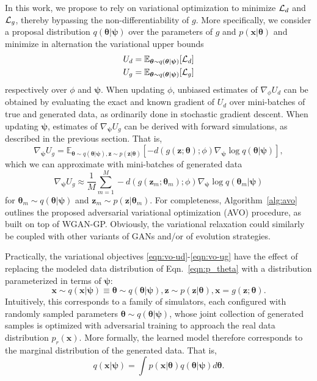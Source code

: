 \documentclass[twocolumn,superscriptaddress,aps]{revtex4-1}
\newcommand{\qxpsi}{q(\mathbf{x}|\bfpsi)}
\newcommand{\bftheta}{{\bm \theta}}
\newcommand{\bfpsi}{{\bm \psi}}
\newcommand{\bfz}{\mathbf{z}}
\theoremstyle{plain}
\begin{document}
In this work, we propose to rely on variational optimization to minimize ${\cal
L}_d$ and ${\cal L}_g$, thereby bypassing the non-differentiability of $g$. More
specifically, we consider a proposal distribution $q(\bftheta|\bfpsi)$ over the
parameters of $g$ and $p(\mathbf{x}|\bftheta)$ and minimize in alternation the variational upper bounds
\begin{align}
    U_d &= \mathbb{E}_{\bftheta \sim q(\bftheta|\bfpsi)} [ {\cal L}_d ] \label{eqn:vo-ud} \\
    U_g &= \mathbb{E}_{\bftheta \sim q(\bftheta|\bfpsi)} [ {\cal L}_g ] \label{eqn:vo-ug}
\end{align} respectively over $\phi$ and $\bfpsi$.
When updating
$\phi$, unbiased estimates of $\nabla_\phi U_d$ can be obtained by
evaluating the exact and known gradient of $U_d$ over mini-batches of true and
generated data, as ordinarily done in stochastic gradient descent. When updating
$\bfpsi$, estimates of $\nabla_\bfpsi U_g$ can be derived with forward
simulations, as described in the previous section.
That is,
\begin{equation}\label{eqn:grad-ug-approx}
    \nabla_\bfpsi U_g = \mathbb{E}_{\bftheta \sim q(\bftheta|\bfpsi), \bfz \sim p(\bfz|\bftheta)}  [-d(g(\bfz;\bftheta);\phi) \nabla_\bfpsi \log q(\bftheta|\bfpsi)],
\end{equation} which we can approximate with mini-batches of
generated data
\begin{equation}
    \nabla_\bfpsi U_g \approx \frac{1}{M} \sum_{m=1}^M -d(g(\bfz_m; \bftheta_m); \phi) \nabla_\bfpsi \log q(\bftheta_m|\bfpsi)
\end{equation}
for $\bftheta_m \sim q(\bftheta|\bfpsi)$ and $\bfz_m \sim p(\bfz|\bftheta_m)$.
For completeness, Algorithm~\ref{alg:avo} outlines the proposed adversarial variational
optimization (AVO) procedure, as built on top of WGAN-GP.
Obviously, the variational relaxation could similarly be coupled with
other variants of GANs and/or of evolution strategies.

Practically, the variational objectives \ref{eqn:vo-ud}-\ref{eqn:vo-ug}
have the effect of replacing the modeled data distribution of Eqn.~\ref{eqn:p_theta} with
a distribution parameterized in terms of $\bfpsi$:
\begin{equation}\label{eqn:p_psi}
    \mathbf{x} \sim \qxpsi \equiv \bftheta \sim q(\bftheta|\bfpsi), \bfz \sim p(\bfz|\bftheta), \mathbf{x} = g(\bfz; \bftheta).
\end{equation}
Intuitively, this corresponds to a family of simulators, each configured
with randomly sampled parameters $\bftheta \sim q(\bftheta|\bfpsi)$, whose joint collection
of generated samples is optimized with adversarial training to approach the real data distribution $p_r(\mathbf{x})$.
More formally, the learned model  therefore corresponds to the marginal distribution
of the generated data. That is,
\begin{equation}
    \qxpsi = \int  p(\mathbf{x}|\bftheta) q(\bftheta|\bfpsi) d\bftheta.
\end{equation}
\end{document}
